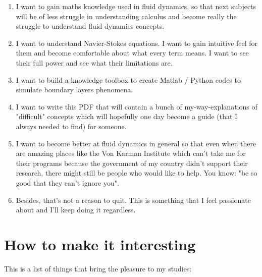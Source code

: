\documentclass[12pt]{report}
\begin{document}
\begin{enumerate}

\item I want to gain maths knowledge used in fluid dynamics, so that next subjects will be of less struggle in understanding calculus and become really the struggle to understand fluid dynamics concepts.

\item I want to understand Navier-Stokes equations. I want to gain intuitive feel for them and become comfortable about what every term means. I want to see their full power and see what their limitations are.

\item I want to build a knowledge toolbox to create Matlab / Python codes to simulate boundary layers phenomena.

\item I want to write this PDF that will contain a bunch of my-way-explanations of "difficult" concepts which will hopefully one day become a guide (that I always needed to find) for someone.

\item I want to become better at fluid dynamics in general so that even when there are amazing places like the Von Karman Institute which can't take me for their programs because the government of my country didn't support their research, there might still be people who would like to help. You know: "be so good that they can't ignore you".

\item Besides, that's not a reason to quit. This is something that I feel passionate about and I'll keep doing it regardless.

\end{enumerate}



\section{How to make it interesting} \label{chap:interesting}

This is a list of things that bring the pleasure to my studies:
\end{document}
